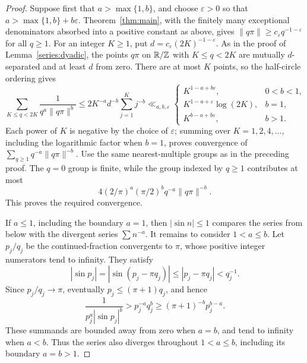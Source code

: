 \begin{proof}
Suppose first that \(a>\max\{1,b\}\), and choose \(\varepsilon>0\)
so that \(a>\max\{1,b\}+b\varepsilon\).
Theorem~\ref{thm:main}, with the finitely many exceptional denominators
absorbed into a positive constant as above, gives
\(\|q\pi\|\ge c_\varepsilon q^{-1-\varepsilon}\) for all \(q\ge1\).
For an integer \(K\ge1\), put \(d=c_\varepsilon(2K)^{-1-\varepsilon}\).
As in the proof of Lemma~\ref{series:dyadic}, the points \(q\pi\)
on \(\mathbb R/\mathbb Z\) with \(K\le q<2K\) are mutually \(d\)-separated
and at least \(d\) from zero. There are at most \(K\) points, so the half-circle ordering gives
\[
 \sum_{K\le q<2K}\frac{1}{q^a\|q\pi\|^b}
 \le 2K^{-a}d^{-b}\sum_{j=1}^{K}j^{-b}
 \ll_{a,b,\varepsilon}
 \begin{cases}
 K^{1-a+b\varepsilon},&0<b<1,\\
 K^{1-a+\varepsilon}\log(2K),&b=1,\\
 K^{b-a+b\varepsilon},&b>1.
 \end{cases}
\]
Each power of \(K\) is negative by the choice of \(\varepsilon\);
summing over \(K=1,2,4,\ldots\), including the logarithmic factor
when \(b=1\), proves convergence of
\(\sum_{q\ge1}q^{-a}\|q\pi\|^{-b}\).
Use the same nearest-multiple groups as in the preceding proof. The
\(q=0\) group is finite, while the group indexed by \(q\ge1\)
contributes at most
\[
 4(2/\pi)^a(\pi/2)^b q^{-a}\|q\pi\|^{-b}.
\]
This proves the required convergence.

If \(a\le1\), including the boundary \(a=1\), then
\(|\sin n|\le1\) compares the series from below with the divergent
series \(\sum n^{-a}\). It remains to consider \(1<a\le b\).
Let \(p_j/q_j\) be the continued-fraction convergents to \(\pi\),
whose positive integer numerators tend to infinity. They satisfy
\[
 |\sin p_j|=|\sin(p_j-\pi q_j)|
 \le|p_j-\pi q_j|<q_j^{-1}.
\]
Since \(p_j/q_j\to\pi\), eventually \(p_j\le(\pi+1)q_j\), and hence
\[
 \frac{1}{p_j^a|\sin p_j|^b}
 >p_j^{-a}q_j^b\ge(\pi+1)^{-b}p_j^{b-a}.
\]
These summands are bounded away from zero when \(a=b\), and tend
to infinity when \(a<b\). Thus the series also diverges throughout
\(1<a\le b\), including its boundary \(a=b>1\).
\end{proof}
